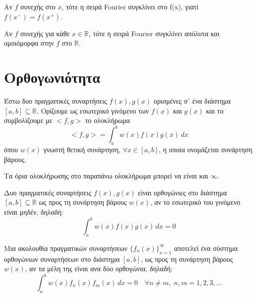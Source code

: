 \begin{rem}
\item {}
    \begin{myitemize}
    \item Αν $f$ συνεχής στο $x$, τότε η σειρά Fourier συγκλίνει στο f(x), γιατί 
        $ f(x^{-}) = f(x^{+}) $.
    \item Αν $f$ συνεχής για κάθε $x \in \mathbb{R} $, τότε η σειρά Fourier 
        συγκλίνει απόλυτα και ομοιόμορφα στην $f$ στο $ \mathbb{R} $.
    \end{myitemize}
\end{rem}

\section{Ορθογωνιότητα}

\begin{dfn}
    Έστω δυο πραγματικές συναρτήσεις $ f(x), g(x) $ ορισμένες σ᾽ ένα διάστημα 
    $ [a,b] \subseteq \mathbb{R} $. Ορίζουμε ως \textcolor{Col1}{εσωτερικό γινόμενο} 
    των $ f(x) $ και $ g(x) $ και το συμβολίζουμε με $ <f,g> $ το ολοκλήρωμα
    \[
        <f,g> = \int _{a}^{b} w(x) f(x)g(x) \,{dx} 
    \] 
    όπου $ w(x) $ γνωστή θετική συνάρτηση, $ \forall x \in [a,b] $, η οποία 
    ονομάζεται \textcolor{Col1}{συνάρτηση βάρους}.
\end{dfn}

\begin{rem}
    Τα όρια ολοκλήρωσης στο παραπάνω ολοκλήρωμα μπορεί να είναι και $ \infty $.
\end{rem}

\begin{dfn}
    Δυο πραγματικές συναρτήσεις $ f(x), g(x) $ είναι \textcolor{Col1}{ορθογώνιες} 
    στο διάστημα $ [a,b] \subseteq \mathbb{R} $ ως προς τη συνάρτηση βάρους $ w(x) $, 
    αν το εσωτερικό του γινόμενο είναι μηδέν, δηλαδή:
    \[
        \int _{a}^{b} w(x)f(x)g(x) \,{dx} = 0
    \] 
\end{dfn}

\begin{dfn}
    Μια ακολουθία πραγματικών συναρτήσεων $ \{ f_{n}(x) \}_{n=1}^{\infty} $ αποτελεί 
    ένα σύστημα ορθογώνιων συναρτήσεων στο διάστημα $ [a,b] $, ως προς τη 
    συνάρτηση βάρους $ w(x) $, αν τα μέλη της είναι ανα δύο ορθογώνια, δηλαδή:
    \[
        \int _{a}^{b} w(x) f_{n}(x)f_{m}(x) \,{dx} = 0 \quad \forall n \neq m, \; n,m = 
        1,2,3, \ldots
    \] 
\end{dfn}

